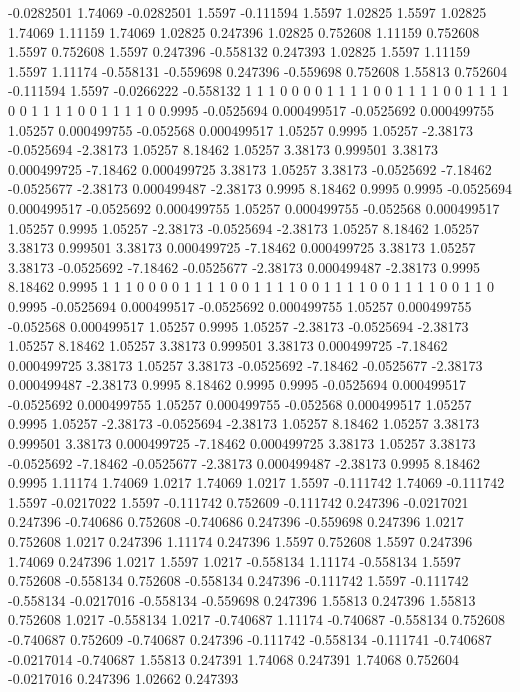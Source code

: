 -0.0282501 1.74069
-0.0282501 1.5597
-0.111594 1.5597
1.02825 1.5597
1.02825 1.74069
1.11159 1.74069
1.02825 0.247396
1.02825 0.752608
1.11159 0.752608
1.5597 0.752608
1.5597 0.247396
-0.558132 0.247393
1.02825 1.5597
1.11159 1.5597
1.11174 -0.558131
-0.559698 0.247396
-0.559698 0.752608
1.55813 0.752604
-0.111594 1.5597
-0.0266222 -0.558132
1 1
1 0
0 0
0 1
1 1
1 0
0 1
1 1
1 0
0 1
1 1
1 0
0 1
1 1
1 0
0 1
1 1
1 0
0.9995 -0.0525694
0.000499517 -0.0525692
0.000499755 1.05257
0.000499755 -0.052568
0.000499517 1.05257
0.9995 1.05257
-2.38173 -0.0525694
-2.38173 1.05257
8.18462 1.05257
3.38173 0.999501
3.38173 0.000499725
-7.18462 0.000499725
3.38173 1.05257
3.38173 -0.0525692
-7.18462 -0.0525677
-2.38173 0.000499487
-2.38173 0.9995
8.18462 0.9995
0.9995 -0.0525694
0.000499517 -0.0525692
0.000499755 1.05257
0.000499755 -0.052568
0.000499517 1.05257
0.9995 1.05257
-2.38173 -0.0525694
-2.38173 1.05257
8.18462 1.05257
3.38173 0.999501
3.38173 0.000499725
-7.18462 0.000499725
3.38173 1.05257
3.38173 -0.0525692
-7.18462 -0.0525677
-2.38173 0.000499487
-2.38173 0.9995
8.18462 0.9995
1 1
1 0
0 0
0 1
1 1
1 0
0 1
1 1
1 0
0 1
1 1
1 0
0 1
1 1
1 0
0 1
1 0
0.9995 -0.0525694
0.000499517 -0.0525692
0.000499755 1.05257
0.000499755 -0.052568
0.000499517 1.05257
0.9995 1.05257
-2.38173 -0.0525694
-2.38173 1.05257
8.18462 1.05257
3.38173 0.999501
3.38173 0.000499725
-7.18462 0.000499725
3.38173 1.05257
3.38173 -0.0525692
-7.18462 -0.0525677
-2.38173 0.000499487
-2.38173 0.9995
8.18462 0.9995
0.9995 -0.0525694
0.000499517 -0.0525692
0.000499755 1.05257
0.000499755 -0.052568
0.000499517 1.05257
0.9995 1.05257
-2.38173 -0.0525694
-2.38173 1.05257
8.18462 1.05257
3.38173 0.999501
3.38173 0.000499725
-7.18462 0.000499725
3.38173 1.05257
3.38173 -0.0525692
-7.18462 -0.0525677
-2.38173 0.000499487
-2.38173 0.9995
8.18462 0.9995
1.11174 1.74069
1.0217 1.74069
1.0217 1.5597
-0.111742 1.74069
-0.111742 1.5597
-0.0217022 1.5597
-0.111742 0.752609
-0.111742 0.247396
-0.0217021 0.247396
-0.740686 0.752608
-0.740686 0.247396
-0.559698 0.247396
1.0217 0.752608
1.0217 0.247396
1.11174 0.247396
1.5597 0.752608
1.5597 0.247396
1.74069 0.247396
1.0217 1.5597
1.0217 -0.558134
1.11174 -0.558134
1.5597 0.752608
-0.558134 0.752608
-0.558134 0.247396
-0.111742 1.5597
-0.111742 -0.558134
-0.0217016 -0.558134
-0.559698 0.247396
1.55813 0.247396
1.55813 0.752608
1.0217 -0.558134
1.0217 -0.740687
1.11174 -0.740687
-0.558134 0.752608
-0.740687 0.752609
-0.740687 0.247396
-0.111742 -0.558134
-0.111741 -0.740687
-0.0217014 -0.740687
1.55813 0.247391
1.74068 0.247391
1.74068 0.752604
-0.0217016 0.247396
1.02662 0.247393
